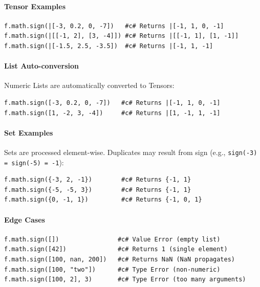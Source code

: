 \paragraph{Tensor Examples}
\begin{verbatim}
f.math.sign(|[-3, 0.2, 0, -7])   #c# Returns |[-1, 1, 0, -1]
f.math.sign(|[[-1, 2], [3, -4]]) #c# Returns |[[-1, 1], [1, -1]]
f.math.sign(|[-1.5, 2.5, -3.5])  #c# Returns |[-1, 1, -1]
\end{verbatim}

\paragraph{List Auto-conversion}
Numeric Lists are automatically converted to Tensors:
\begin{verbatim}
f.math.sign([-3, 0.2, 0, -7])   #c# Returns |[-1, 1, 0, -1]
f.math.sign([1, -2, 3, -4])     #c# Returns |[1, -1, 1, -1]
\end{verbatim}

\paragraph{Set Examples}
Sets are processed element-wise. Duplicates may result from sign (e.g., \texttt{sign(-3) = sign(-5) = -1}):
\begin{verbatim}
f.math.sign({-3, 2, -1})        #c# Returns {-1, 1}
f.math.sign({-5, -5, 3})        #c# Returns {-1, 1}
f.math.sign({0, -1, 1})         #c# Returns {-1, 0, 1}
\end{verbatim}

\paragraph{Edge Cases}
\begin{verbatim}
f.math.sign([])                #c# Value Error (empty list)
f.math.sign([42])              #c# Returns 1 (single element)
f.math.sign([100, nan, 200])   #c# Returns NaN (NaN propagates)
f.math.sign([100, "two"])      #c# Type Error (non-numeric)
f.math.sign([100, 2], 3)       #c# Type Error (too many arguments)
\end{verbatim}

